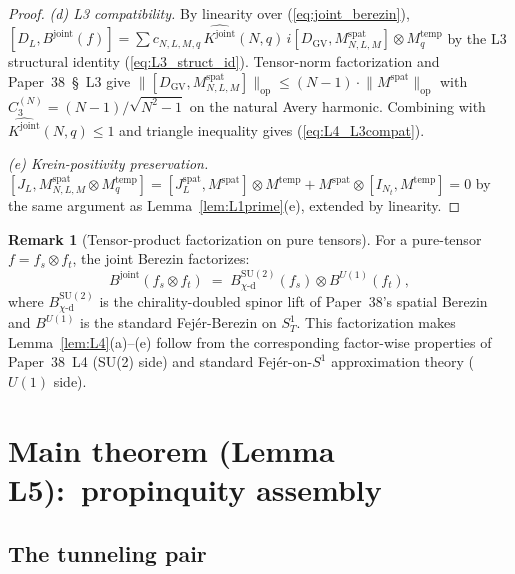 \documentclass[11pt,a4paper]{article}
\theoremstyle{plain}
\theoremstyle{definition}
\newtheorem{remark}[theorem]{Remark}
\newcommand{\Nt}{N_{t}}
\newcommand{\Sone}{S^{1}}
\newcommand{\SoneT}{S^{1}_{T}}
\newcommand{\opnorm}[1]{\lVert #1 \rVert_{\mathrm{op}}}
\newcommand{\SU}{\mathrm{SU}}
\newcommand{\Uone}{U(1)}
\newcommand{\DGV}{D_{\mathrm{GV}}}
\newcommand{\DL}{D_{L}}
\newcommand{\JL}{J_{L}}
\newcommand{\Bjoint}{B^{\mathrm{joint}}}
\newcommand{\Kjoint}{K^{\mathrm{joint}}}
\newcommand{\spat}{\mathrm{spat}}
\newcommand{\temp}{\mathrm{temp}}
\newcommand{\chid}{\chi\text{-d}}
\newcommand{\Plancherel}{\hat}
\begin{document}
\begin{proof}
\emph{(d) L3 compatibility.} By linearity over (\ref{eq:joint_berezin}),
$[\DL, \Bjoint(f)] = \sum c_{N,L,M,q}\,\Plancherel{\Kjoint}(N, q)\,
i[\DGV, M^{\spat}_{N,L,M}] \otimes M^{\temp}_{q}$ by the L3 structural
identity (\ref{eq:L3_struct_id}). Tensor-norm factorization and
Paper~38~\S~L3 give $\opnorm{[\DGV, M^{\spat}_{N,L,M}]} \le (N - 1)
\cdot \opnorm{M^{\spat}}$ with $C_{3}^{(N)} = (N-1)/\sqrt{N^{2} - 1}$
on the natural Avery harmonic. Combining with $\Plancherel{\Kjoint}(N,
q) \le 1$ and triangle inequality gives (\ref{eq:L4_L3compat}).

\emph{(e) Krein-positivity preservation.}
$[\JL, M^{\spat}_{N,L,M} \otimes M^{\temp}_{q}] = [\JL^{\spat},
M^{\spat}] \otimes M^{\temp} + M^{\spat} \otimes [I_{\Nt}, M^{\temp}]
= 0$ by the same argument as Lemma~\ref{lem:L1prime}(e), extended by
linearity. \qedhere
\end{proof}

\begin{remark}[Tensor-product factorization on pure tensors]\label{rem:L4_factorize}
For a pure-tensor $f = f_{s} \otimes f_{t}$, the joint Berezin
factorizes:
\begin{equation}\label{eq:L4_factorize}
   \Bjoint(f_{s} \otimes f_{t})
   \;=\; B^{\SU(2)}_{\chid}(f_{s}) \otimes B^{\Uone}(f_{t}),
\end{equation}
where $B^{\SU(2)}_{\chid}$ is the chirality-doubled spinor lift of
Paper~38's spatial Berezin and $B^{\Uone}$ is the standard
Fej\'er-Berezin on $\SoneT$. This factorization makes
Lemma~\ref{lem:L4}(a)--(e) follow from the corresponding factor-wise
properties of Paper~38~L4 (SU(2) side) and standard
Fej\'er-on-$\Sone$ approximation theory ($\Uone$ side).
\end{remark}

\section{Main theorem (Lemma L5):\ propinquity assembly}\label{sec:main}

\subsection{The tunneling pair}\label{sec:tunneling_pair}
\end{document}

